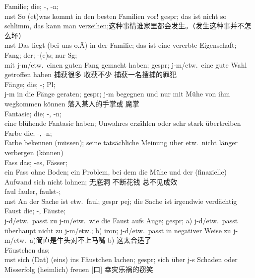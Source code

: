 \noindent
Familie; die; -, -n;\\
mst So (et)was kommt in den besten Familien vor! gespr; das ist nicht so schlimm, das kann man verzeihen;这种事情谁家里都会发生。（发生这种事并不怎么坏）\\
mst Das liegt (bei uns o.\"A) in der Familie; das ist eine vererbte Eigenschaft; \\

\noindent
Fang; der; -(e)s; nur Sg;\\
mit j-m/etw.\ einen guten Fang gemacht haben; gespr; j-m/etw.\ eine gute Wahl getroffen haben 捕获很多 收获不少 捕获一名搜捕的罪犯\\

\noindent
F\"ange; die; -; Pl; \\
j-m in die F\"ange geraten; gespr; j-m begegnen und nur mit M\"uhe von ihm wegkommen k\"onnen 落入某人的手掌或 魔掌\\

\noindent
Fantasie; die; -, -n;\\
eine bl\"uhende Fantasie haben; Unwahres erz\"ahlen oder sehr stark \"ubertreiben \\

\noindent
Farbe die; -, -n;\\
Farbe bekennen (m\"ussen); seine tats\"achliche Meinung \"uber etw.\ nicht l\"anger verbergen (k\"onnen)\\

\noindent
Fass das; -es, F\"asser;\\
ein Fass ohne Boden; ein Problem, bei dem die M\"uhe und der (finazielle) Aufwand sich nicht lohnen; 无底洞 不断花钱 总不见成效\\

\noindent
faul fauler, faulst-;\\
mst An der Sache ist etw.\ faul; gespr pej; die Sache ist irgendwie verd\"achtig\\

\noindent
Faust die; -, F\"auste;\\
j-d/etw.\ passt zu j-m/etw.\ wie die Faust aufs Auge; gespr; a) j-d/etw.\ passt \"uberhaupt nicht zu j-m/etw.; b) iron; j-d/etw.\ passt in negativer Weise zu j-m/etw.\ a)简直是牛头对不上马嘴 b) 这太合适了 \\

\noindent
F\"austchen das; \\
mst sich (Dat) (eins) ins F\"austchen lachen; gespr; sich \"uber j-s Schaden oder Misserfolg (heimlich) freuen [口] 幸灾乐祸的窃笑\\

